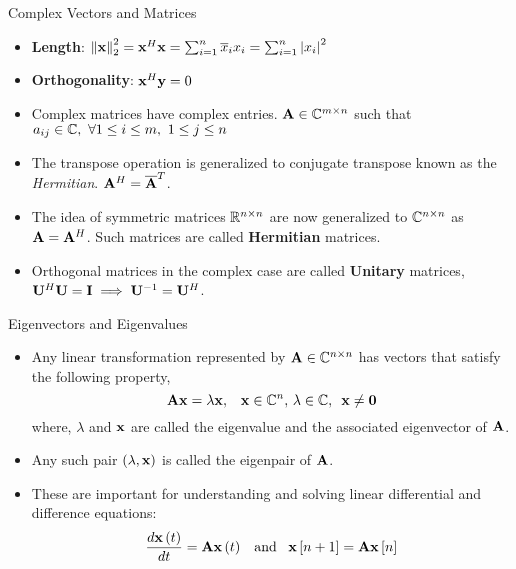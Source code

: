 \documentclass[aspectratio=169]{beamer}
\let\olditem\item
\renewcommand{\item}{\setlength{\itemsep}{\fill}\olditem}
\def\mf{\ensuremath\mathbf}
\def\mb{\ensuremath\mathbb}
\begin{document}
\begin{frame}[t]{Complex Vectors and Matrices}
\begin{itemize}
    \item \textbf{Length}: $\left\lVert \mf{x}\right\rVert_2^2 = \mf{x}^H\mf{x} = \sum_{i=1}^n\overline{x}_ix_i = \sum_{i=1}^n\left\lvert x_i\right\rvert^2$

    \item \textbf{Orthogonality}: $\mf{x}^H\mf{y} = 0$

    \item Complex matrices have complex entries. $\mf{A} \in \mb{C}^{m \times n}$ such that $a_{ij} \in \mb{C}, \,\, \forall 1 \leq i \leq m, \,\, 1 \leq j \leq n$

    \item The transpose operation is generalized to conjugate transpose known as the \textit{Hermitian}. $\mf{A}^H = \overline{\mf{A}}^T$.
    
    \item The idea of symmetric matrices $\mb{R}^{n \times n}$ are now generalized to $\mb{C}^{n \times n}$  as $\mf{A} = \mf{A}^H$. Such matrices are called \textbf{Hermitian} matrices.

    \item Orthogonal matrices in the complex case are called \textbf{Unitary} matrices, $\mf{U}^H\mf{U} = \mf{I} \implies \mf{U}^{-1} = \mf{U}^H$.
\end{itemize}
\end{frame}


\begin{frame}[t]{Eigenvectors and Eigenvalues}
\begin{itemize}
    \item Any linear transformation represented by $\mf{A} \in \mb{C}^{n \times n}$ has vectors that satisfy the following property,
    \[ \mf{Ax} = \lambda \mf{x}, \,\,\,\,\, \mf{x} \in \mb{C}^n, \, \lambda \in \mb{C}, \,\,\, \mf{x} \neq \mf{0} \]
    where, $\lambda$ and $\mf{x}$ are called the eigenvalue and the associated eigenvector of $\mf{A}$.
    
    \item Any such pair $\left(\lambda, \mf{x}\right)$ is called the eigenpair of $\mf{A}$.
    
    \item These are important for understanding and solving linear differential and difference equations:
    \[ \frac{d\mf{x}\left(t\right)}{dt} = \mf{A}\mf{x}\left(t\right) \,\,\, \text{ and } \,\,\, \mf{x}\left[n+1\right] = \mf{A}\mf{x}\left[n\right] \]
\end{itemize}
\end{frame}
\end{document}
